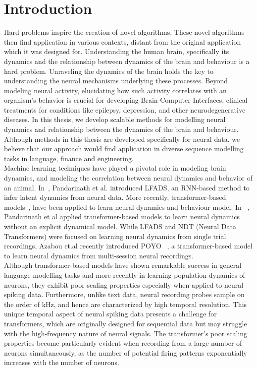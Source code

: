 \chapter{Introduction}
\label{ch:intro}

Hard problems inspire the creation of novel algorithms. These novel algorithms then find application in various contexts, distant from the original application which it was designed for. Understanding the human brain, specifically its dynamics and the relationship between dynamics of the brain and behaviour is a hard problem.  Unraveling the dynamics of the brain holds the key to understanding the neural mechanisms underlying these processes. Beyond modeling neural activity, elucidating how such activity correlates with an organism's behavior is crucial for developing Brain-Computer Interfaces, clinical treatments for conditions like epilepsy, depression, and other neurodegenerative diseases. In this thesis, we develop scalable methods for modelling neural dynamics and relationship between the dynamics of the brain and behaviour.   Although methods in this thesis are developed specifically for neural data, we believe that our approach would find application in diverse sequence modelling tasks in language, finance and engineering. 
\\


Machine learning techniques have played a pivotal role in modeling brain dynamics, and modeling the correlation between neural dynamics and behavior of an animal. In~\cite{pandarinath2018inferring}, Pandarinath et al. introduced LFADS, an RNN-based method to infer latent dynamics from neural data.  More recently, transformer-based models~\cite{vaswani2017attention, geneva2022transformers}, have been applied to learn neural dynamics and behaviour model. In ~\cite{ye2021representation}, Pandarinath et al applied transformer-based models to learn neural dynamics without an explicit dynamical model. While LFADS and NDT (Neural Data Transformers) were focused on learning neural dynamics from single trial recordings, Azabou et.al recently introduced POYO ~\cite{azabou2023unified}, a transformer-based model to learn neural dynamics from multi-session neural recordings.
\\

Although transformer-based models have shown remarkable success in general language modelling tasks and more recently in learning population dynamics of neurons, they exhibit poor scaling properties especially when applied to neural spiking data. Furthermore, unlike text data, neural recording probes sample on the order of kHz, and hence are characterized by high temporal resolution. This unique temporal aspect of neural spiking data presents a challenge for transformers, which are originally designed for sequential data but may struggle with the high-frequency nature of neural signals. The transformer's poor scaling properties become particularly evident when recording from a large number of neurons simultaneously, as the number of potential firing patterns exponentially increases with the number of neurons.
\\

